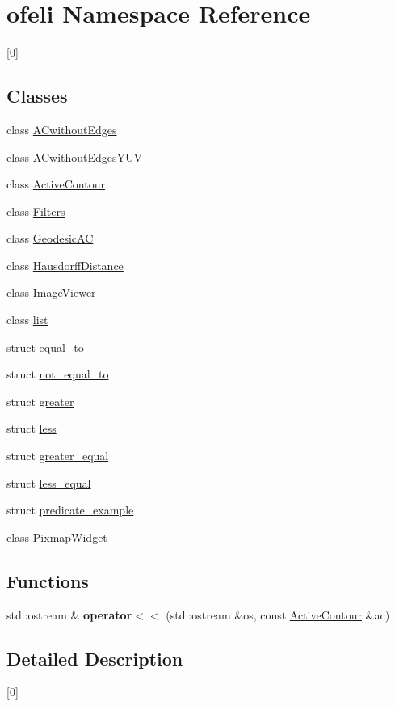 \hypertarget{namespaceofeli}{\section{ofeli Namespace Reference}
\label{namespaceofeli}
}


\mbox{[}0\mbox{]}  


\subsection*{Classes}
\begin{DoxyCompactItemize}
\item 
class \hyperlink{classofeli_1_1_a_cwithout_edges}{A\-Cwithout\-Edges}
\item 
class \hyperlink{classofeli_1_1_a_cwithout_edges_y_u_v}{A\-Cwithout\-Edges\-Y\-U\-V}
\item 
class \hyperlink{classofeli_1_1_active_contour}{Active\-Contour}
\item 
class \hyperlink{classofeli_1_1_filters}{Filters}
\item 
class \hyperlink{classofeli_1_1_geodesic_a_c}{Geodesic\-A\-C}
\item 
class \hyperlink{classofeli_1_1_hausdorff_distance}{Hausdorff\-Distance}
\item 
class \hyperlink{classofeli_1_1_image_viewer}{Image\-Viewer}
\item 
class \hyperlink{classofeli_1_1list}{list}
\item 
struct \hyperlink{structofeli_1_1equal__to}{equal\-\_\-to}
\item 
struct \hyperlink{structofeli_1_1not__equal__to}{not\-\_\-equal\-\_\-to}
\item 
struct \hyperlink{structofeli_1_1greater}{greater}
\item 
struct \hyperlink{structofeli_1_1less}{less}
\item 
struct \hyperlink{structofeli_1_1greater__equal}{greater\-\_\-equal}
\item 
struct \hyperlink{structofeli_1_1less__equal}{less\-\_\-equal}
\item 
struct \hyperlink{structofeli_1_1predicate__example}{predicate\-\_\-example}
\item 
class \hyperlink{classofeli_1_1_pixmap_widget}{Pixmap\-Widget}
\end{DoxyCompactItemize}
\subsection*{Functions}
\begin{DoxyCompactItemize}
\item 
\hypertarget{namespaceofeli_af7b300a99ca8e627574941520ef1954b}{std\-::ostream \& {\bfseries operator$<$$<$} (std\-::ostream \&os, const \hyperlink{classofeli_1_1_active_contour}{Active\-Contour} \&ac)}\label{namespaceofeli_af7b300a99ca8e627574941520ef1954b}

\end{DoxyCompactItemize}


\subsection{Detailed Description}
\mbox{[}0\mbox{]} 